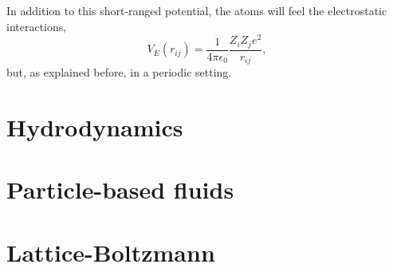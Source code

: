 In addition to this short-ranged potential, the atoms will feel the 
electrostatic interactions,
\begin{equation*}
  V_E(r_{ij}) = \frac{1}{4 \pi \epsilon_0} \frac{Z_i Z_j e^2}{r_{ij}},
\end{equation*}
but, as explained before, in a periodic setting.


\section{Hydrodynamics}


\section{Particle-based fluids}

\section{Lattice-Boltzmann}

